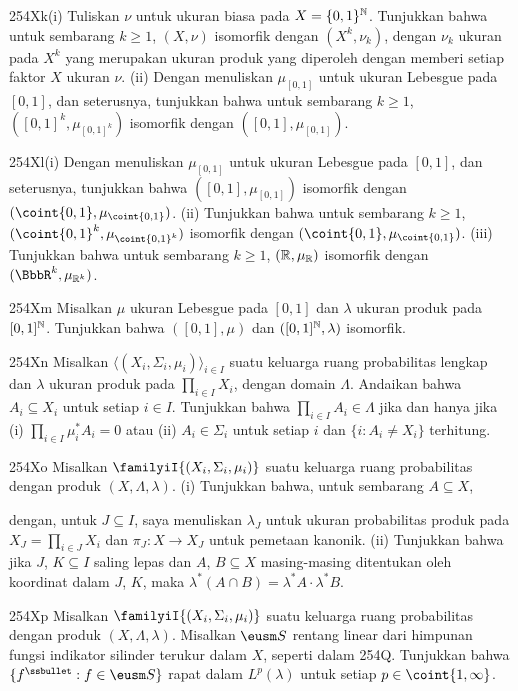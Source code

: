 {\spheader 254Xk(i) Tuliskan $\nu$ untuk ukuran biasa pada
$X=\{0,1\}^{\Bbb N}$. Tunjukkan bahwa untuk sembarang $k\ge 1$, $(X,\nu)$
isomorfik dengan $(X^k,\nu_k)$, dengan $\nu_k$ ukuran pada $X^k$ yang
merupakan ukuran produk yang diperoleh dengan memberi setiap faktor $X$ ukuran
$\nu$. (ii) Dengan menuliskan $\mu_{[0,1]}$ untuk ukuran Lebesgue pada
$[0,1]$, dan seterusnya, tunjukkan bahwa untuk sembarang $k\ge 1$, $([0,1]^k,\mu_{[0,1]^k})$
isomorfik dengan $([0,1],\mu_{[0,1]})$.

\spheader 254Xl(i) Dengan menuliskan $\mu_{[0,1]}$ untuk ukuran Lebesgue pada
$[0,1]$, dan seterusnya, tunjukkan bahwa $([0,1],\mu_{[0,1]})$ isomorfik dengan
$(\coint{0,1},\mu_{\coint{0,1}})$. (ii) Tunjukkan bahwa untuk sembarang $k\ge
1$, $(\coint{0,1}^k,\mu_{\coint{0,1}^k})$ isomorfik dengan
$(\coint{0,1},\mu_{\coint{0,1}})$. (iii) Tunjukkan bahwa untuk sembarang $k\ge
1$, $(\Bbb R,\mu_{\Bbb R})$ isomorfik dengan $(\BbbR^k,\mu_{\Bbb
R^k})$.

\spheader 254Xm Misalkan $\mu$ ukuran Lebesgue pada $[0,1]$ dan
$\lambda$ ukuran produk pada $[0,1]^{\Bbb N}$. Tunjukkan bahwa
$([0,1],\mu)$ dan $([0,1]^{\Bbb N},\lambda)$ isomorfik.

\spheader 254Xn Misalkan $\langle(X_i,\Sigma_i,\mu_i)\rangle_{i\in I}$
suatu keluarga ruang probabilitas lengkap dan $\lambda$ ukuran produk
pada $\prod_{i\in I}X_i$, dengan domain $\Lambda$. Andaikan bahwa
$A_i\subseteq X_i$ untuk
setiap $i\in I$. Tunjukkan bahwa $\prod_{i\in I}A_i\in\Lambda$ jika dan hanya jika (i)
$\prod_{i\in I}\mu_i^*A_i=0$ atau (ii) $A_i\in\Sigma_i$ untuk
setiap $i$ dan $\{i:A_i\ne X_i\}$ terhitung. 

\spheader 254Xo Misalkan $\familyiI{(X_i,\Sigma_i,\mu_i)}$ suatu keluarga
ruang probabilitas dengan produk $(X,\Lambda,\lambda)$. (i) Tunjukkan bahwa,
untuk sembarang $A\subseteq X$,


\noindent dengan, untuk $J\subseteq I$, saya menuliskan $\lambda_J$ untuk ukuran
probabilitas produk pada $X_J=\prod_{i\in J}X_i$ dan $\pi_J:X\to X_J$ untuk
pemetaan kanonik. (ii) Tunjukkan bahwa jika $J$, $K\subseteq I$ saling lepas
dan $A$, $B\subseteq X$ masing-masing ditentukan oleh koordinat dalam $J$, $K$,
maka $\lambda^*(A\cap B)=\lambda^*A\cdot\lambda^*B$.

\spheader 254Xp Misalkan $\familyiI{(X_i,\Sigma_i,\mu_i)}$ suatu keluarga
ruang probabilitas dengan produk $(X,\Lambda,\lambda)$. Misalkan $\eusm S$
rentang linear dari himpunan fungsi indikator silinder terukur
dalam $X$, seperti dalam 254Q. Tunjukkan bahwa
$\{f^{\ssbullet}:f\in\eusm S\}$ rapat dalam $L^p(\lambda)$ untuk setiap
$p\in\coint{1,\infty}$.

}
